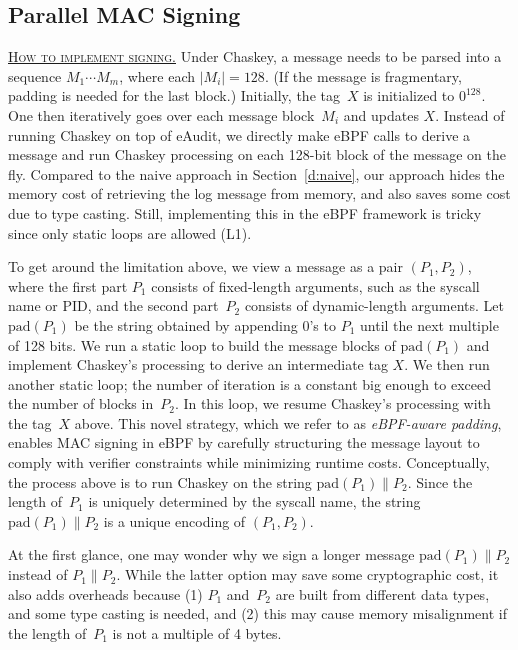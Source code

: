 \documentclass[sigconf]{sty/acmart}
\newcommand{\noskipheading}[1]{\noindent\textsc{\underline{#1}}}
\newcommand{\secref}[1]{Section~\ref{#1}}
\newcommand{\pad}{\mathrm{pad}}
\newcommand{\concat}{\|}
\begin{document}
\subsection{Parallel MAC Signing} \label{s:sign}
\noskipheading{How to implement signing.} 
Under Chaskey,  a message needs to be parsed into a sequence $M_1 \cdots M_m$, where each $|M_i| = 128$. 
(If the  message is fragmentary, padding is needed for the last block.)  
Initially, the tag~$X$ is initialized to $0^{128}$. 
One then iteratively goes over each message block~$M_i$ and updates $X$. 
Instead of running Chaskey on top of eAudit, 
we directly make eBPF calls to derive a message
and run Chaskey processing on each 128-bit block of the message on the fly.
Compared to the naive approach in \secref{d:naive},  
our approach hides the memory cost of retrieving the log message from memory, 
and also saves some cost due to type casting. 
Still, implementing this in the eBPF framework is tricky since only static loops are allowed (L1).

To get around the limitation above, we view a message as a pair $(P_1, P_2)$, 
where the first part $P_1$ consists of fixed-length arguments, such as the syscall name or PID, 
and the second part~$P_2$ consists of dynamic-length arguments. 
Let $\pad(P_1)$ be the string obtained by appending $0$'s to $P_1$
until the next multiple of 128 bits. 
We run a static loop to build  the message blocks of $\pad(P_1)$
and implement Chaskey's processing to derive an intermediate tag $X$. 
We then run another static loop; the number of iteration is a 
constant big enough to exceed the number of blocks in~$P_2$. 
In this loop, we resume Chaskey's processing with the tag~$X$ above. This novel strategy, which we refer to as \emph{eBPF-aware padding}, enables
MAC signing in eBPF by carefully structuring the message layout to comply with verifier constraints
while minimizing runtime costs. Conceptually, the process above is to run Chaskey on the string
$\pad(P_1) \concat P_2$. Since the length of~$P_1$ is uniquely determined by the syscall name,
the string $\pad(P_1) \concat P_2$ is a unique encoding of $(P_1, P_2)$. 

 At the first glance, one may wonder why we sign a longer message $\pad(P_1) \concat P_2$
instead of $P_1 \concat P_2$. 
While the latter option may save some cryptographic cost, it also adds 
overheads because  (1) $P_1$ and~$P_2$ are built from different data types, and some type casting is needed, 
and (2) this may cause memory misalignment
if the length of~$P_1$ is not a multiple of 4 bytes. 
\end{document}
